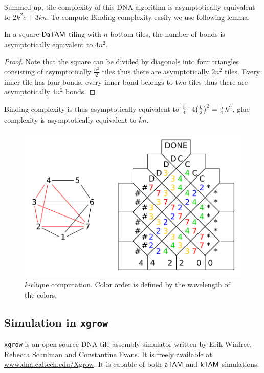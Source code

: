 Summed up, tile complexity of this DNA algorithm is asymptotically equivalent to $2 k^2 e + 3 kn$. To compute Binding complexity easily we use following lemma.

\begin{lemma}
	In a square $\mathsf{DaTAM}$ tiling with $n$ bottom tiles, the number of bonds is asymptotically equivalent to $4 n^2$.
\end{lemma}
\begin{proof}
	Note that the square can be divided by diagonals into four triangles consisting of asymptotically $\frac{n^2}{2}$ tiles thus there are asymptotically $2n^2$ tiles. Every inner tile has four bonds, every inner bond belongs to two tiles thus there are asymptotically $4n^2$ bonds.
\end{proof}

Binding complexity is thus asymptotically equivalent to $\nicefrac{5}{4} \cdot 4 \bigl(\frac{k}{2}\bigr)^2 = \nicefrac{5}{4}\,k^2$, glue complexity is asymptotically equivalent to $kn$.

\begin{figure}[H]
\begin{center}
	\includegraphics[scale=0.75]{./figures/k-clique/k-clique.pdf}
	\caption{$k$-clique computation. Color order is defined by the wavelength of the colors.}
	\label{fig:k-clique}
\end{center}
\end{figure}

\subsection{Simulation in {\tt xgrow}}

{\tt xgrow} is an open source DNA tile assembly simulator written by Erik Winfree, Rebecca Schulman and Constantine Evans. It is freely available at \url{www.dna.caltech.edu/Xgrow}. It is capable of both $\mathsf{aTAM}$ and $\mathsf{kTAM}$ simulations.


